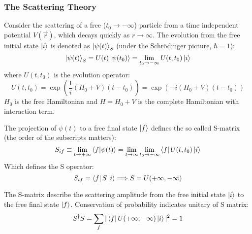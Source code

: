 \subsubsection{The Scattering Theory}
Consider the scattering of a free ($t_0 \rightarrow -\infty$) particle from a 
time independent potential $V(\vec{r})$, 
which decays quickly as $r \rightarrow \infty$. The evolution from the free initial state
$\ket{i}$ is denoted as $\ket{\psi(t)}_S$ (under the Schr\"odinger picture, $\hbar = 1$):
\begin{equation}
    \ket{\psi(t)}_S = U(t)\ket{\psi(t_0)} = \lim_{t_0 \rightarrow -\infty}U(t, t_0)\ket{i}
\end{equation}
where $U(t, t_0)$ is the evolution operator:
\begin{equation}
    U(t, t_0) = \exp(\frac{1}{i}(H_0 + V)(t - t_0)) = \exp(-i(H_0 + V)(t-t_0))
\end{equation}
$H_0$ is the free Hamiltonian and $H = H_0 + V$ is the complete Hamiltonian
with interaction term. 

The projection of $\psi(t)$ to a free final state $\ket{f}$ defines the so called
S-matrix (the order of the subscripts matters):
\begin{equation}
    S_{if} \equiv \lim_{t\rightarrow +\infty}\bra{f}\ket{\psi(t)} 
    = \lim_{t\rightarrow\infty} \lim_{t_0 \rightarrow -\infty} \bra{f} U(t, t_0) \ket{i}
\end{equation}
Which defines the S operator:
\begin{equation}
    S_{if} = \bra{f} S \ket{i} \Longrightarrow S = U(+\infty, -\infty)
\end{equation}

The S-matrix describe the scattering amplitude from the free initial state $\ket{i}$
to the free final state $\ket{f}$. Conservation of probability indicates
unitary of S matrix:
\begin{equation}
    S^\dag S = \sum_f |\bra{f} U(+\infty, -\infty) \ket{i}|^2 = 1
\end{equation}

